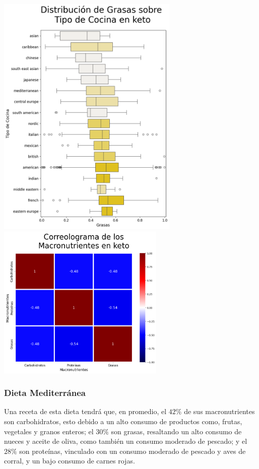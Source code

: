 \documentclass[12pt,a4paper]{article}
\begin{document}
            \begin{center}
                \includegraphics[width=0.65\textwidth]{Resources/2_03_plot_02_3.png}
                \includegraphics[width=0.6\textwidth]{Resources/2_03_plot_02_4.png}
            \end{center}

        \subsubsection{Dieta Mediterránea}

            Una receta de esta dieta tendrá que, en promedio, el $42\%$ de sus 
            macronutrientes son carbohidratos, esto debido a un alto consumo de 
            productos como, frutas, vegetales y granos enteros; el $30\%$ son 
            grasas, resaltando un alto consumo de nueces y aceite de oliva, como 
            también un consumo moderado de pescado; y el $28\%$ son proteínas, 
            vinculado con un consumo moderado de pescado y aves de corral, y un 
            bajo consumo de carnes rojas.\\
\end{document}
